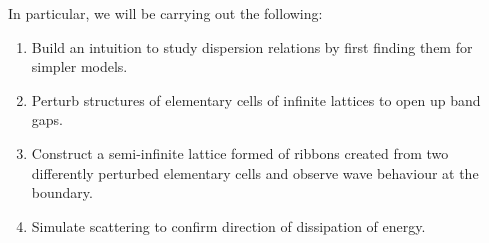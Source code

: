 In particular, we will be carrying out the following:

\begin{enumerate}
\item Build an intuition to study dispersion relations by first finding them
      for simpler models.
\item Perturb structures of elementary cells of infinite lattices to open up
      band gaps.
\item Construct a semi-infinite lattice formed of ribbons created from two
      differently perturbed elementary cells and observe wave behaviour at the
      boundary.
\item Simulate scattering to confirm direction of dissipation of energy.
\end{enumerate}



